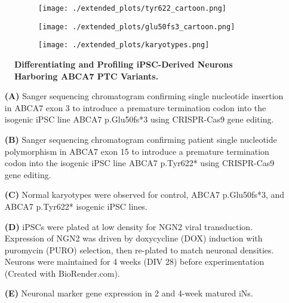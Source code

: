 \begin{figure}[H]
    \begin{subfigure}[t]{0.4\textwidth}
        \caption{}
        \hspace{1.5cm}
        \texttt{[image: ./extended\_plots/tyr622\_cartoon.png]}        
    \end{subfigure}  
    \hspace{1.5cm}
    \begin{subfigure}[t]{0.4\textwidth}
        \caption{}
        \texttt{[image: ./extended\_plots/glu50fs3\_cartoon.png]}        
    \end{subfigure}  
    \par
    \begin{subfigure}[t]{0.9\textwidth}
        \caption{}
        \hspace{1.5cm}
        \texttt{[image: ./extended\_plots/karyotypes.png]}        
    \end{subfigure}  
    \caption{
        \textbf{Differentiating and Profiling iPSC-Derived Neurons Harboring ABCA7 PTC Variants.}\\
    }
    \label{fig:differentiating_iPSC_neurons}
\end{figure}
\begin{itemize}
    \item[\textbf{(A)}] Sanger sequencing chromatogram confirming single nucleotide insertion in ABCA7 exon 3 to introduce a premature termination codon into the isogenic iPSC line ABCA7 p.Glu50fs*3 using CRISPR-Cas9 gene editing. 
    \item[\textbf{(B)}] Sanger sequencing chromatogram confirming patient single nucleotide polymorphism in ABCA7 exon 15 to introduce a premature termination codon into the isogenic iPSC line ABCA7 p.Tyr622* using CRISPR-Cas9 gene editing. 
    \item[\textbf{(C)}] Normal karyotypes were observed for control, ABCA7 p.Glu50fs*3, and ABCA7 p.Tyr622* isogenic iPSC lines. 
    \item[\textbf{(D)}] iPSCs were plated at low density for NGN2 viral transduction. Expression of NGN2 was driven by doxycycline (DOX) induction with puromycin (PURO) selection, then re-plated to match neuronal densities. Neurons were maintained for 4 weeks (DIV 28) before experimentation (Created with BioRender.com). 
    \item[\textbf{(E)}] Neuronal marker gene expression in 2 and 4-week matured iNs. 
\end{itemize}
